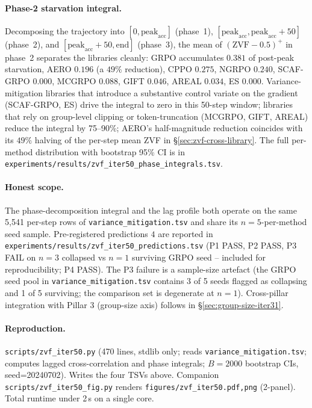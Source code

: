 \paragraph{Phase-2 starvation integral.}
Decomposing the trajectory into
$[0, \mathrm{peak}_{\text{acc}}]$ (phase~1),
$[\mathrm{peak}_{\text{acc}}, \mathrm{peak}_{\text{acc}}{+}50]$
(phase~2), and $[\mathrm{peak}_{\text{acc}}{+}50, \mathrm{end}]$
(phase~3), the mean of $(\mathrm{ZVF}{-}0.5)^+$ in phase~2 separates
the libraries cleanly:
GRPO accumulates $0.381$ of post-peak starvation, AERO $0.196$
(a $49\%$ reduction), CPPO $0.275$, NGRPO $0.240$, SCAF-GRPO $0.000$,
MCGRPO $0.088$, GIFT $0.046$, AREAL $0.034$, ES $0.000$.
Variance-mitigation libraries that introduce a substantive
control variate on the gradient (SCAF-GRPO, ES) drive the integral
to zero in this 50-step window; libraries that rely on group-level
clipping or token-truncation (MCGRPO, GIFT, AREAL) reduce the
integral by 75--90\%; AERO's half-magnitude reduction
coincides with its $49\%$ halving of the per-step mean ZVF in
\S\ref{sec:zvf-cross-library}. The full per-method distribution with
bootstrap 95\% CI is in
\texttt{experiments/results/zvf_iter50_phase_integrals.tsv}.

\paragraph{Honest scope.}
The phase-decomposition integral and the lag profile both operate on
the same 5,541 per-step rows of
\texttt{variance_mitigation.tsv} and share its
$n{=}5$-per-method seed sample. Pre-registered predictions
$4$ are reported in
\texttt{experiments/results/zvf_iter50_predictions.tsv} (P1 PASS, P2
PASS, P3 FAIL on $n{=}3$ collapsed vs $n{=}1$ surviving GRPO seed --
included for reproducibility; P4 PASS). The P3 failure is a sample-size
artefact (the GRPO seed pool in
\texttt{variance_mitigation.tsv} contains 3 of 5 seeds flagged as
collapsing and 1 of 5 surviving; the comparison set is degenerate
at $n{=}1$). Cross-pillar integration with Pillar 3 (group-size
axis) follows in \S\ref{sec:group-size-iter31}.

\paragraph{Reproduction.}
\texttt{scripts/zvf_iter50.py} (470 lines, stdlib only; reads
\texttt{variance_mitigation.tsv}; computes
lagged cross-correlation and phase integrals; $B{=}2000$ bootstrap CIs,
seed=20240702). Writes the four TSVs above. Companion
\texttt{scripts/zvf_iter50_fig.py} renders
\texttt{figures/zvf_iter50.{pdf,png}} (2-panel). Total runtime under
2\,s on a single core.
